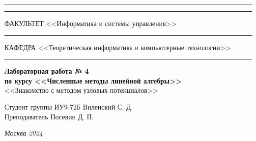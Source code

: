 \documentclass[a4paper, 14pt]{extarticle}
\begin{document}
\begin{titlepage}
\vspace{-25pt}
\hspace{-35pt}\rule{\textwidth}{2.3pt}

\vspace*{-20.3pt}
\hspace{-35pt}\rule{\textwidth}{0.4pt}

\vspace{1.5ex}
\hspace{-35pt} \noindent \small ФАКУЛЬТЕТ\hspace{80pt} <<Информатика и системы управления>>

\vspace*{-16pt}
\hspace{47pt}\rule{0.83\textwidth}{0.4pt}

\vspace{0.5ex}
\hspace{-35pt} \noindent \small КАФЕДРА\hspace{50pt} <<Теоретическая информатика и компьютерные технологии>>

\vspace*{-16pt}
\hspace{30pt}\rule{0.866\textwidth}{0.4pt}
  
\vspace{11em}

\begin{center}
\Large {\bf Лабораторная работа № 4} \\ 
\large {\bf по курсу <<Численные методы линейной алгебры>>} \\
\large <<Знакомство с методом узловых потенциалов>> 
\end{center}\normalsize

\vspace{8em}


\begin{flushright}
  {Студент группы ИУ9-72Б Виленский С. Д. \hspace*{15pt}\\ 
  \vspace{2ex}
  Преподаватель Посевин Д. П.\hspace*{15pt}}
\end{flushright}

\bigskip

\vfill
 

\begin{center}
\textsl{Москва 2024}
\end{center}
\end{titlepage}
\end{document}
